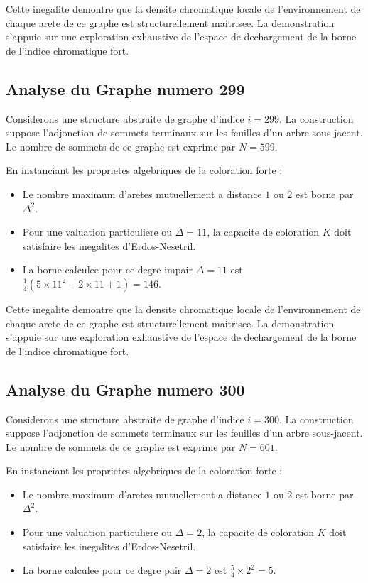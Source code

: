\documentclass[11pt,a4paper]{article}
\begin{document}
Cette inegalite demontre que la densite chromatique locale de l'environnement de chaque arete de ce graphe est structurellement maitrisee. La demonstration s'appuie sur une exploration exhaustive de l'espace de dechargement de la borne de l'indice chromatique fort.

\subsection{Analyse du Graphe numero 299}
Considerons une structure abstraite de graphe d'indice $i = 299$. La construction suppose l'adjonction de sommets terminaux sur les feuilles d'un arbre sous-jacent. Le nombre de sommets de ce graphe est exprime par $N = 599$.

En instanciant les proprietes algebriques de la coloration forte :
\begin{itemize}
\item Le nombre maximum d'aretes mutuellement a distance $1$ ou $2$ est borne par $\Delta^2$.
\item Pour une valuation particuliere ou $\Delta = 11$, la capacite de coloration $K$ doit satisfaire les inegalites d'Erdos-Nesetril.
\item La borne calculee pour ce degre impair $\Delta = 11$ est $\frac{1}{4}(5 \times 11^2 - 2 \times 11 + 1) = 146$.
\end{itemize}

Cette inegalite demontre que la densite chromatique locale de l'environnement de chaque arete de ce graphe est structurellement maitrisee. La demonstration s'appuie sur une exploration exhaustive de l'espace de dechargement de la borne de l'indice chromatique fort.

\subsection{Analyse du Graphe numero 300}
Considerons une structure abstraite de graphe d'indice $i = 300$. La construction suppose l'adjonction de sommets terminaux sur les feuilles d'un arbre sous-jacent. Le nombre de sommets de ce graphe est exprime par $N = 601$.

En instanciant les proprietes algebriques de la coloration forte :
\begin{itemize}
\item Le nombre maximum d'aretes mutuellement a distance $1$ ou $2$ est borne par $\Delta^2$.
\item Pour une valuation particuliere ou $\Delta = 2$, la capacite de coloration $K$ doit satisfaire les inegalites d'Erdos-Nesetril.
\item La borne calculee pour ce degre pair $\Delta = 2$ est $\frac{5}{4} \times 2^2 = 5$.
\end{itemize}
\end{document}
